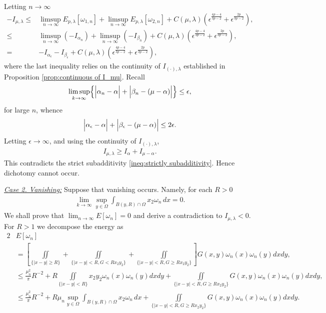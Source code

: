 \documentclass[11pt,letterpaper]{amsart}
\theoremstyle{definition}
\theoremstyle{remark}
\renewcommand{\O}{\Omega}
\newcommand{\eps}{\epsilon}
\numberwithin{equation}{section}
\begin{document}
Letting $n\to \infty$
\begin{align*}
    -I_{\mu,\lambda} \leq & \limsup_{n\to \infty} E_{p,\lambda}[\omega_{1,n}] + \limsup_{n\to \infty} E_{p,\lambda}[\omega_{2,n}] + C( \mu,\lambda) (\eps^{\frac{4p-4}{3p-2}} + \eps^{\frac{2p}{3p-2}}), \\
    \leq & \limsup_{n\to \infty} (-I_{\alpha_n}) + \limsup_{n\to \infty} (-I_{\beta_n}) + C( \mu,\lambda) (\eps^{\frac{4p-4}{3p-2}} + \eps^{\frac{2p}{3p-2}}), \\
    = & -I_{\alpha_\eps} - I_{\beta_\eps} + C( \mu,\lambda) (\eps^{\frac{4p-4}{3p-2}} + \eps^{\frac{2p}{3p-2}}),
\end{align*}
where the last inequality relies on the continuity of $I_{(\cdot),\lambda}$ established in Proposition \ref{prop:continuous of I_mu}. Recall 
\begin{align*}
\limsup_{k\to\infty}\Bigl\{\Bigl|\alpha_n-\alpha\Bigr|
+ \Bigl|\beta_n-(\mu-\alpha)\Bigr|\Bigr\} \le \epsilon,
\end{align*}
for large $n$, whence
\begin{align*}
\Bigl|\alpha_\eps-\alpha\Bigr|
+ \Bigl|\beta_\eps-(\mu-\alpha)\Bigr| \leq 2\epsilon.
\end{align*}
Letting $\eps\to \infty$, and using the continuity of $I_{(\cdot),\lambda}$,
\begin{align*}
    I_{\mu,\lambda} \geq I_{\alpha} + I_{\mu-\alpha}.
\end{align*}
This contradicts the strict subadditivity \eqref{ineq:strictly subadditivity}. Hence dichotomy cannot occur.

\underline{\textit{Case 2. Vanishing:}} Suppose that vanishing occurs. Namely, for each \(R>0\)
\begin{align*}
\lim_{k\to\infty}\sup_{y\in \O}\int_{B(y,R)\cap \O}x_2\omega_{n}\,dx = 0 .
\end{align*}
We shall prove that $\lim_{n\to \infty}E[\omega_n]=0$ and derive a contradiction to $I_{\mu,\lambda}<0$. For $R>1$ we decompose the energy as
\begin{align*}
    2&E[\omega_n] \\
    & = \left[ \iint\limits_{ \{ |x-y|\geq R\} } + \iint\limits_{ \{ |x-y|< R, G < Rx_2y_2\} } + \iint\limits_{ \{ |x-y|< R, G \geq  Rx_2y_2\} } \right] G(x,y)\omega_n(x)\omega_n(y)dxdy, \\
    & \leq \frac{\mu_n^2}{\pi}R^{-2} + R \iint\limits_{ \{ |x-y|< R\} } x_2y_2\omega_n(x)\omega_n(y)dxdy + \iint\limits_{ \{ |x-y|< R, G \geq Rx_2y_2\} } G(x,y)\omega_n(x)\omega_n(y)dxdy , \\
    & \leq \frac{\mu_n^2}{\pi}R^{-2} + R \mu_n \sup_{y\in \O}\int_{B(y,R)\cap \O}x_2\omega_{n}\,dx + \iint\limits_{ \{ |x-y|< R, G \geq Rx_2y_2\} } G(x,y)\omega_n(x)\omega_n(y)dxdy .
\end{align*}
\end{document}
